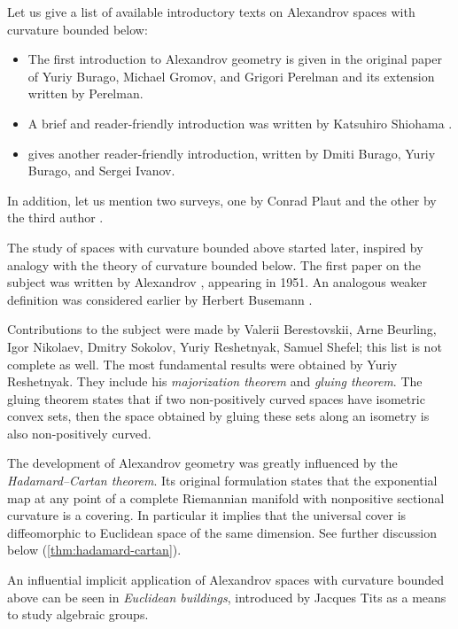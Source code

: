 %
Let us give a list of available introductory texts on Alexandrov spaces with curvature bounded below: 
\begin{itemize}
\item The first introduction to Alexandrov geometry is given in the original paper of Yuriy Burago, Michael Gromov, and Grigori Perelman \cite{burago-gromov-perelman} 
and its extension \cite{perelman:spaces2} written by Perelman.
\item A brief and reader-friendly introduction was written by Katsuhiro Shiohama \cite[Sections 1--8]{shiohama}.
\item \cite[Chapter 10]{burago-burago-ivanov} gives another reader-friendly introduction, written by Dmiti Burago, Yuriy Burago, and Sergei Ivanov.
\end{itemize}
In addition, let us mention two surveys, one by Conrad Plaut \cite{plaut:survey} and the other by the third author \cite{petrunin:survey}.

{\sloppy

The study of  spaces with curvature bounded above started later,
inspired by analogy with the theory of curvature bounded below.
The first paper on the subject was written by Alexandrov \cite{alexandrov:strong-angle}, appearing in 1951.
An analogous weaker definition was considered earlier by Herbert Busemann \cite{busemann-CBA}.

}

Contributions to the subject were made by
Valerii Berestovskii, 
Arne Beurling, 
Igor Nikolaev,
Dmitry Sokolov,
Yuriy Reshetnyak,
Samuel Shefel; this list is not complete as well.
The most fundamental results were obtained by Yuriy Reshetnyak.
They include his {}\emph{majorization theorem} and {}\emph{gluing theorem}.
The gluing theorem states that if two non-positively curved spaces have isometric convex sets, then the space obtained by gluing these sets along an isometry is also non-positively curved.

The development of Alexandrov geometry was greatly influenced by the {}\emph{Hadamard--Cartan theorem}.
Its original formulation states that the exponential map at any point of a complete Riemannian manifold with nonpositive sectional curvature is a covering.
In particular it implies that the universal cover is diffeomorphic to Euclidean space of the same dimension. 
See further discussion below (\ref{thm:hadamard-cartan}).

An influential implicit application of Alexandrov spaces with curvature bounded above can be seen in {}\emph{Euclidean buildings}, introduced by Jacques Tits as a means to study algebraic groups.


